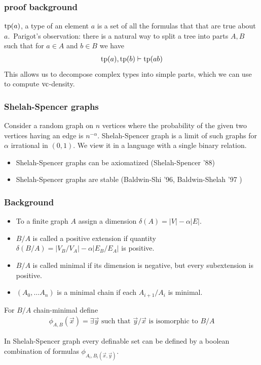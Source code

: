 \documentclass{beamer}
\begin{document}
\begin{frame}
	\frametitle{proof background}
	$\operatorname{tp}(a)$, a type of an element $a$ is a set of all the formulas that that are true about $a$.\
	Parigot's observation: there is a natural way to split a tree into parts $A, B$ such that for $a \in A$ and $b \in B$ we have
	\begin{align*}
		\operatorname{tp}(a), \operatorname{tp}(b) \vdash \operatorname{tp}(ab)
	\end{align*}
	This allows us to decompose complex types into simple parts, which we can use to compute $\operatorname{vc}$-density.
\end{frame}

\begin{frame}
	\frametitle{Shelah-Spencer graphs}
	Consider a random graph on $n$ vertices where the probability of the given two vertices having an edge is $n^{-\alpha}$.
	Shelah-Spencer graph is a limit of such graphs for $\alpha$ irrational in $(0,1)$.
	We view it in a language with a single binary relation.
	\begin{itemize}
		\item Shelah-Spencer graphs can be axiomatized (Shelah-Spencer '88)
		\item Shelah-Spencer graphs are stable (Baldwin-Shi '96, Baldwin-Shelah '97 )
	\end{itemize}
\end{frame}

\begin{frame}
	\frametitle{Background}
\begin{Definition}
	\begin{itemize}
		\item To a finite graph $A$ assign a dimension $\delta(A) = |V| - \alpha |E|$.
		\item $B/A$ is called a positive extension if quantity $\delta(B/A) = |V_B/V_A| - \alpha |E_B/E_A|$ is positive.
		\item $B/A$ is called minimal if its dimension is negative, but every subextension is positive.
		\item $(A_0, \ldots A_n)$ is a minimal chain if each $A_{i + 1}/A_i$ is minimal.
	\end{itemize}
\end{Definition}
	For $B/A$ chain-minimal define
	\begin{align*}
		\phi_{A,B}(\vec x) = \exists \vec y \text { such that $\vec y/\vec x$ is isomorphic to $B/A$}
	\end{align*}
	\begin{Theorem} 
		In Shelah-Spencer graph every definable set can be defined by a boolean combination of formulas $\phi_{A_i, B_i(\vec x, \vec y)}$.
	\end{Theorem}
\end{frame}
\end{document}
